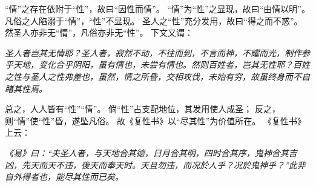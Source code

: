 \documentclass[11pt]{article}
\begin{document}
“情”之存在依附于“性”，故曰“因性而情”。
“情”为“性”之显现，故曰“由情以明”。
凡俗之人陷溺于“情”，“性”不显现。
圣人之“性”充分发用，故曰“得之而不惑”。
然圣人亦非无“情”，凡俗亦非无“性”。
下文又谓：

\textit{圣人者岂其无情耶？圣人者，寂然不动，不往而到，不言而神，不耀而光，制作参乎天地，变化合乎阴阳，虽有情也，未尝有情也。然则百姓者，岂其无性耶？百姓之性与圣人之性弗差也，虽然，情之所昏，交相攻伐，未始有穷，故虽终身而不自睹其性焉。}

总之，人人皆有“性”“情”。
倘“性”占支配地位，其发用使人成圣；
反之，则“情”使“性”昏，遂坠凡俗。
故《复性书》以“尽其性”为价值所在。
《复性书》上云：

\textit{《易》曰：“夫圣人者，与天地合其德，日月合其明，四时合其序，鬼神合其吉凶，先天而天不违，後天而奉天时。天且勿违，而况於人乎？况於鬼神乎？”此非自外得者也，能尽其性而已矣。}
\end{document}
